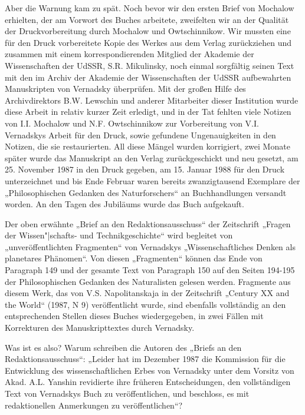 \documentclass[11pt,a4paper]{article}
\begin{document}
Aber die Warnung kam zu spät. Noch bevor wir den ersten Brief von Mochalow
erhielten, der am Vorwort des Buches arbeitete, zweifelten wir an der Qualität
der Druckvorbereitung durch Mochalow und Owtschinnikow. Wir mussten eine für
den Druck vorbereitete Kopie des Werkes aus dem Verlag zurückziehen und
zusammen mit einem korrespondierenden Mitglied der Akademie der Wissenschaften
der UdSSR, S.R. Mikulinsky, noch einmal sorgfältig seinen Text mit den im
Archiv der Akademie der Wissenschaften der UdSSR aufbewahrten Manuskripten von
Vernadsky überprüfen. Mit der großen Hilfe des Archivdirektors B.W. Lewschin
und anderer Mitarbeiter dieser Institution wurde diese Arbeit in relativ
kurzer Zeit erledigt, und in der Tat fehlten viele Notizen von I.I. Mochalow
und N.F. Owtschinnikow zur Vorbereitung von V.I. Vernadskys Arbeit für den
Druck, sowie gefundene Ungenauigkeiten in den Notizen, die sie restaurierten.
All diese Mängel wurden korrigiert, zwei Monate später wurde das Manuskript an
den Verlag zurückgeschickt und neu gesetzt, am 25. November 1987 in den Druck
gegeben, am 15. Januar 1988 für den Druck unterzeichnet und bis Ende Februar
waren bereits zwanzigtausend Exemplare der „Philosophischen Gedanken des
Naturforschers“ an Buchhandlungen versandt worden. An den Tagen des Jubiläums
wurde das Buch aufgekauft.

Der oben erwähnte „Brief an den Redaktionsausschuss“ der Zeitschrift „Fragen
der Wissen"|schafts- und Technikgeschichte“ wird begleitet von
„unveröffentlichten Fragmenten“ von Vernadskys „Wissenschaftliches Denken als
planetares Phänomen“. Von diesen „Fragmenten“ können das Ende von Paragraph
149 und der gesamte Text von Paragraph 150 auf den Seiten 194-195 der
Philosophischen Gedanken des Naturalisten gelesen werden. Fragmente aus diesem
Werk, das von V.S. Napolitanskaja in der Zeitschrift „Century XX and the
World“ (1987, N 9) veröffentlicht wurde, sind ebenfalls vollständig an den
entsprechenden Stellen dieses Buches wiedergegeben, in zwei Fällen mit
Korrekturen des Manuskripttextes durch Vernadsky.

Was ist es also? Warum schreiben die Autoren des „Briefs an den
Redaktionsausschuss“: „Leider hat im Dezember 1987 die Kommission für die
Entwicklung des wissenschaftlichen Erbes von Vernadsky unter dem Vorsitz von
Akad. A.L. Yanshin revidierte ihre früheren Entscheidungen, den vollständigen
Text von Vernadskys Buch zu veröffentlichen, und beschloss, es mit
redaktionellen Anmerkungen zu veröffentlichen“?
\end{document}
